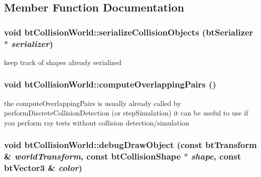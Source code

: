 \subsection{Member Function Documentation}
\hypertarget{classbt_collision_world_eed5861d66035fa72f40e27b04bdc056}{
\subsubsection[serializeCollisionObjects]{\setlength{\rightskip}{0pt plus 5cm}void btCollisionWorld::serializeCollisionObjects (btSerializer $\ast$ {\em serializer})}}
\label{classbt_collision_world_eed5861d66035fa72f40e27b04bdc056}




keep track of shapes already serialized \hypertarget{classbt_collision_world_fb32fb7ecb40aa6247fd3df18ba81098}{
\subsubsection[computeOverlappingPairs]{\setlength{\rightskip}{0pt plus 5cm}void btCollisionWorld::computeOverlappingPairs ()}}
\label{classbt_collision_world_fb32fb7ecb40aa6247fd3df18ba81098}


the computeOverlappingPairs is usually already called by performDiscreteCollisionDetection (or stepSimulation) it can be useful to use if you perform ray tests without collision detection/simulation \hypertarget{classbt_collision_world_c1ca6489c220005798069152c3df0d08}{
\subsubsection[debugDrawObject]{\setlength{\rightskip}{0pt plus 5cm}void btCollisionWorld::debugDrawObject (const btTransform \& {\em worldTransform}, \/  const btCollisionShape $\ast$ {\em shape}, \/  const btVector3 \& {\em color})}}
\label{classbt_collision_world_c1ca6489c220005798069152c3df0d08}




